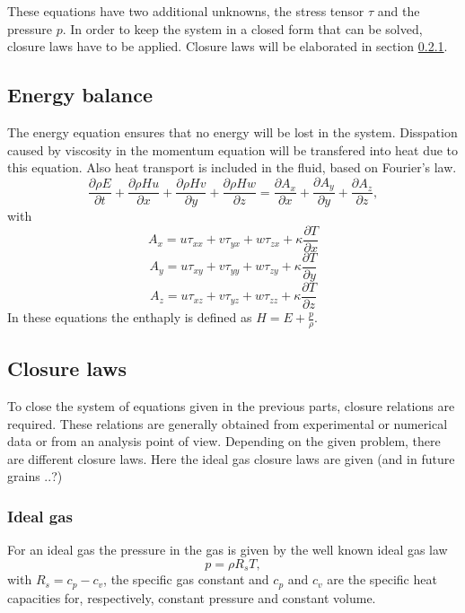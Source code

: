 \documentclass{report}
\newcommand{\dt}[1]{\frac{\partial #1}{\partial t}}
\newcommand{\dx}[1]{\frac{\partial #1}{\partial x}}
\newcommand{\dy}[1]{\frac{\partial #1}{\partial y}}
\newcommand{\dz}[1]{\frac{\partial #1}{\partial z}}
\begin{document}
These equations have two additional unknowns, the stress tensor $\tau$ and the pressure $p$. In order to keep the system in a closed form that can be solved, closure laws have to be applied. Closure laws will be elaborated in section \ref{}.

\subsection{Energy balance}
The energy equation ensures that no energy will be lost in the system. Disspation caused by viscosity in the momentum equation will be transfered into heat due to this equation. Also heat transport is included in the fluid, based on Fourier's law.
\begin{equation}
\label{e:energyBalance}
\dt{\rho E} + \dx{\rho H u} + \dy{\rho H v} + \dz{\rho H w} 
= \dx{A_x}
+ \dy{A_y} 
+ \dz{A_z},
\end{equation}
with
\begin{equation}
\label{e:energyBalance_Ax}
A_x = u \tau_{xx} + v \tau_{yx} + w \tau_{zx} + \kappa\dx{T}
\end{equation}
\begin{equation}
\label{e:energyBalance_Ay}
A_y = u \tau_{xy} + v \tau_{yy} + w \tau_{zy} + \kappa\dy{T}
\end{equation}
\begin{equation}
\label{e:energyBalance_Az}
A_z = u \tau_{xz} + v \tau_{yz} + w \tau_{zz} + \kappa\dz{T}
\end{equation}
In these equations the enthaply is defined as $H = E + \frac{p}{\rho}$.

\subsection{Closure laws}
To close the system of equations given in the previous parts, closure relations are required. These relations are generally obtained from experimental or numerical data or from an analysis point of view. Depending on the given problem, there are different closure laws. Here the ideal gas closure laws are given (and in future grains ..?)
\subsubsection{Ideal gas}
For an ideal gas the pressure in the gas is given by the well known ideal gas law
\begin{equation}
\label{e:idealGasLaw}
p = \rho R_s T,
\end{equation}
with $R_s = c_p - c_v$, the specific gas constant and $c_p$ and $c_v$ are the specific heat capacities for, respectively, constant pressure and constant volume. 
\end{document}
